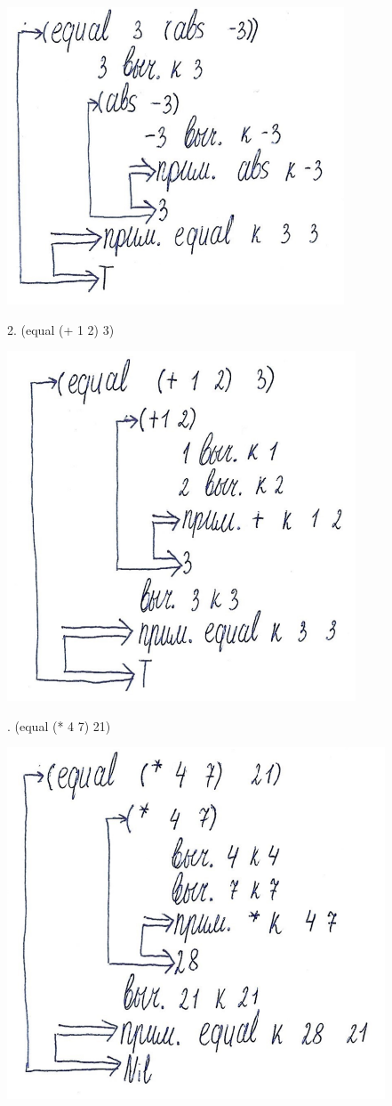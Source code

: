 \documentclass[12pt]{report}
\begin{document}
\includegraphics[scale=1.5]{img/1.1}

2. (equal (+ 1 2) 3)

\includegraphics[scale=1.5]{img/1.2}

. (equal (* 4 7) 21)

\includegraphics[scale=1.5]{img/1.3}
\end{document}
